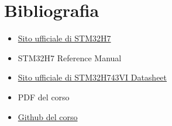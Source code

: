 \pagebreak
\section{Bibliografia}

\begin{itemize}
    \item \hyperref{https://www.st.com/en/microcontrollers-microprocessors/stm32h7-series.html}{}{}{Sito ufficiale di STM32H7}
    \item STM32H7 Reference Manual
    \item \hyperref{https://www.st.com/resource/en/datasheet/stm32h743vi.pdf}{}{}{Sito ufficiale di STM32H743VI Datasheet}
    \item PDF del corso
    \item \hyperref{https://www.github.com/ABoldetti/Elettronica}{}{}{Github del corso}
\end{itemize}